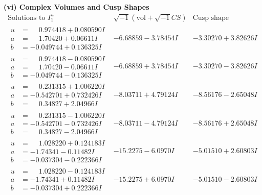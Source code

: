 \documentclass[1p]{elsarticle_modified}
\theoremstyle{definition}
\newcommand{\I}{\sqrt{-1}}
\begin{document}
\newpage\flushleft \textbf{(vi) Complex Volumes and Cusp Shapes}
$$\begin{array}{c|c|c}  
\text{Solutions to }I^u_{1}& \I (\text{vol} + \sqrt{-1}CS) & \text{Cusp shape}\\
 \hline 
\begin{aligned}
u &= \phantom{-}0.974418 + 0.080590 I \\
a &= \phantom{-}1.70420 + 0.06611 I \\
b &= -0.049744 + 0.136325 I\end{aligned}
 & -6.68859 - 3.78454 I & -3.30270 + 3.82626 I \\ \hline\begin{aligned}
u &= \phantom{-}0.974418 - 0.080590 I \\
a &= \phantom{-}1.70420 - 0.06611 I \\
b &= -0.049744 - 0.136325 I\end{aligned}
 & -6.68859 + 3.78454 I & -3.30270 - 3.82626 I \\ \hline\begin{aligned}
u &= \phantom{-}0.231315 + 1.006220 I \\
a &= -0.542701 + 0.732426 I \\
b &= \phantom{-}0.34827 + 2.04966 I\end{aligned}
 & -8.03711 + 4.79124 I & -8.56176 - 2.65048 I \\ \hline\begin{aligned}
u &= \phantom{-}0.231315 - 1.006220 I \\
a &= -0.542701 - 0.732426 I \\
b &= \phantom{-}0.34827 - 2.04966 I\end{aligned}
 & -8.03711 - 4.79124 I & -8.56176 + 2.65048 I \\ \hline\begin{aligned}
u &= \phantom{-}1.028220 + 0.124183 I \\
a &= -1.74341 - 0.11482 I \\
b &= -0.037304 - 0.222366 I\end{aligned}
 & -15.2275 - 6.0970 I & -5.01510 + 2.60803 I \\ \hline\begin{aligned}
u &= \phantom{-}1.028220 - 0.124183 I \\
a &= -1.74341 + 0.11482 I \\
b &= -0.037304 + 0.222366 I\end{aligned}
 & -15.2275 + 6.0970 I & -5.01510 - 2.60803 I \\ \hline\begin{aligned}

\end{aligned}
\end{array}$$
\end{document}
